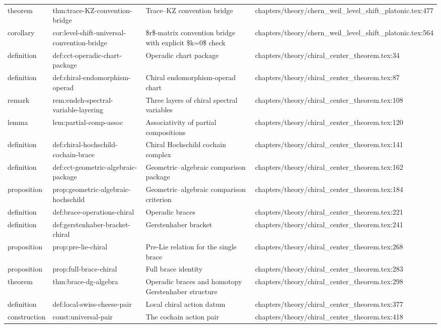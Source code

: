 \documentclass[11pt]{article}
\begin{document}
\begin{longtable}{L{0.10\textwidth}L{0.26\textwidth}L{0.42\textwidth}L{0.22\textwidth}}
theorem & thm:trace-KZ-convention-bridge & Trace--KZ convention bridge & chapters/theory/chern\_weil\_level\_shift\_platonic.tex:477\\
corollary & cor:level-shift-universal-convention-bridge & \$r\$-matrix convention bridge with explicit \$k=0\$ check & chapters/theory/chern\_weil\_level\_shift\_platonic.tex:564\\
definition & def:cct-operadic-chart-package & Operadic chart package & chapters/theory/chiral\_center\_theorem.tex:34\\
definition & def:chiral-endomorphism-operad & Chiral endomorphism-operad chart & chapters/theory/chiral\_center\_theorem.tex:87\\
remark & rem:endch-spectral-variable-layering & Three layers of chiral spectral variables & chapters/theory/chiral\_center\_theorem.tex:108\\
lemma & lem:partial-comp-assoc & Associativity of partial compositions & chapters/theory/chiral\_center\_theorem.tex:120\\
definition & def:chiral-hochschild-cochain-brace & Chiral Hochschild cochain complex & chapters/theory/chiral\_center\_theorem.tex:141\\
definition & def:cct-geometric-algebraic-package & Geometric--algebraic comparison package & chapters/theory/chiral\_center\_theorem.tex:162\\
proposition & prop:geometric-algebraic-hochschild & Geometric--algebraic comparison criterion & chapters/theory/chiral\_center\_theorem.tex:184\\
definition & def:brace-operations-chiral & Operadic braces & chapters/theory/chiral\_center\_theorem.tex:221\\
definition & def:gerstenhaber-bracket-chiral & Gerstenhaber bracket & chapters/theory/chiral\_center\_theorem.tex:241\\
proposition & prop:pre-lie-chiral & Pre-Lie relation for the single brace & chapters/theory/chiral\_center\_theorem.tex:268\\
proposition & prop:full-brace-chiral & Full brace identity & chapters/theory/chiral\_center\_theorem.tex:283\\
theorem & thm:brace-dg-algebra & Operadic braces and homotopy Gerstenhaber structure & chapters/theory/chiral\_center\_theorem.tex:298\\
definition & def:local-swiss-cheese-pair & Local chiral action datum & chapters/theory/chiral\_center\_theorem.tex:377\\
construction & const:universal-pair & The cochain action pair & chapters/theory/chiral\_center\_theorem.tex:418\\

\end{longtable}
\end{document}
